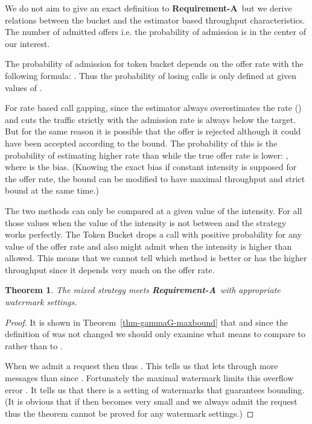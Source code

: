 \documentclass[conference]{IEEEtran}
\newtheorem{theorem}{Theorem}
\newcommand{\comment}[1]{}
\newcommand{\reqA}{\textbf{Requirement-A}}
\begin{document}
We do not aim to give an exact definition to \reqA\ but we derive
relations between the bucket and the estimator based throughput
characteristics. The number of admitted offers i.e. the probability
of admission is in the center of our interest.

The probability of admission for token bucket depends on the offer
rate with the following formula: . Thus
the probability of losing calls is only defined at given values of
.

For rate based call gapping, since the estimator always
overestimates the rate () and cuts the
traffic strictly with  the admission rate is always below the
target. But for the same reason it is possible that the offer is
rejected although it could have been accepted according to the
bound. The probability of this is the probability of estimating
higher rate than  while the true offer rate is lower:
,
where  is the bias.
(Knowing the exact bias if constant intensity is supposed for the
offer rate, the bound can be modified to have maximal throughput and
strict bound at the same time.)

The two methods can only be compared at a given value of the
intensity. For all those values when the value of the intensity is
not between  and  the  strategy works
perfectly. The Token Bucket drops a call with positive probability
for any value of the offer rate and also might admit when the
intensity is higher than allowed. This means that we cannot tell
which method is better or has the higher throughput since it depends
very much on the offer rate.

\comment{Annak lenne itten ertelme, hogy mondjuk  es igy ki lehet szamolni, hogy hogyan talalja
el a dolgokat egyik, ill. masik. \comment{Arrol van itt szo, hogy a
valaki megmondana nekem, hogy pontosan hova esik az offer rate,
milyen tartomanyba. Mondjuk valaki adna nekem egy eloszlast az offer
rate-re, akkor mar meg tudnam mondani, addig nem.}}

\begin{theorem}\label{thm-gammaX-maxbound} The mixed strategy  meets
\reqA\ with appropriate watermark settings.
\end{theorem}

\begin{proof} It is shown in Theorem~\ref{thm-gammaG-maxbound} that
 and since the definition of  was not
changed we should only examine what means to compare  to
 rather than to .

When we admit a request then 
thus . This tells
us that  lets through more messages than  since
. Fortunately the
maximal watermark limits this overflow error . It tells us that
there is a setting of watermarks that guarantees bounding. (It is
obvious that if  then 
becomes very small and we always admit the request thus the theorem
cannot be proved for any watermark settings.) \end{proof}
\end{document}
